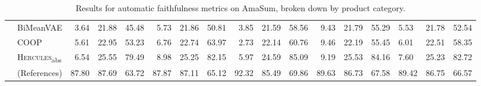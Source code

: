 \documentclass[11pt]{article}
\begin{document}
\begin{table*}[t!]
\begin{tabular}{@{~}cl@{~}||@{~}r@{~}r@{~}r@{~}|@{~}r@{~}r@{~}r@{~}|@{~}r@{~}r@{~}r@{~}|@{~}r@{~}r@{~}r@{~}HHH}
 & BiMeanVAE &  3.64 & 21.88 & 45.48 &  5.73 & 21.86 & 50.81 &  3.85 & 21.59 & 58.56 &  9.43 & 21.79 & 55.29 & 5.53 & 21.78 & 52.54 \\ 
 & COOP &  5.61 & 22.95 & 53.23 &  6.76 & 22.74 & 63.97 &  2.73 & 22.14 & 60.76 &  9.46 & 22.19 & 55.45 & 6.01 & 22.51 & 58.35 \\ 
 & \textsc{Hercules}\textsubscript{abs} &  6.54 & 25.55 & 79.49 &  8.98 & 25.25 & 82.15 &  5.97 & 24.59 & 85.09 &  9.19 & 25.53 & 84.16 & 7.60 & 25.23 & 82.72 \\ 
 \hline
 & (References) &  87.80 & 87.69 & 63.72 &  87.87 & 87.11 & 65.12 &  92.32 & 85.49 & 69.86 &  89.63 & 86.73 & 67.58 & 89.42 & 86.75 & 66.57 \\ 

    \end{tabular}

    \caption{Results for automatic faithfulness metrics on AmaSum, broken down by product category.}
    \label{tab:amasum_qa_by_cat}
\end{table*}
\end{document}
